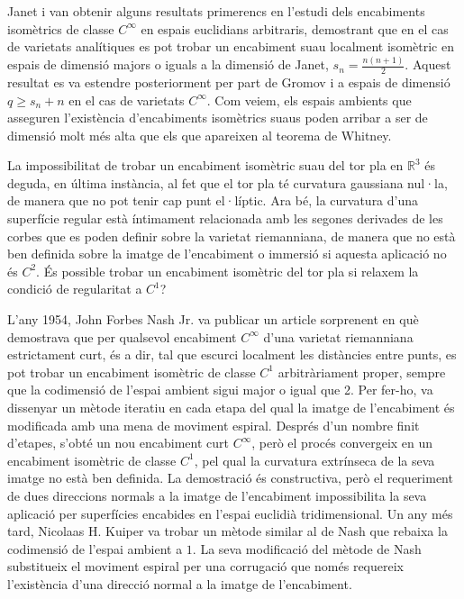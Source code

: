 Janet i \citet{cartan1927} van obtenir alguns resultats primerencs en l'estudi dels encabiments isomètrics de classe $C^\infty$ en espais euclidians arbitraris, demostrant que en el cas de varietats analítiques es pot trobar un encabiment suau localment isomètric en espais de dimensió majors o iguals a la dimensió de Janet, $s_n = \frac{n(n+1)}{2}$. Aquest resultat es va estendre posteriorment per part de Gromov i \citet{rokhlin1970} a espais de dimensió $q\ge s_n+n$ en el cas de varietats $C^\infty$. Com veiem, els espais ambients que asseguren l'existència d'encabiments isomètrics suaus poden arribar a ser de dimensió molt més alta que els que apareixen al teorema de Whitney.

La impossibilitat de trobar un encabiment isomètric suau del tor pla en $\mathbb R^3$ és deguda, en última instància, al fet que el tor pla té curvatura gaussiana nul·la, de manera que no pot tenir cap punt el·líptic. Ara bé, la curvatura d'una superfície regular està íntimament relacionada amb les segones derivades de les corbes que es poden definir sobre la varietat riemanniana, de manera que no està ben definida sobre la imatge de l'encabiment o immersió si aquesta aplicació no és $C^2$. És possible trobar un encabiment isomètric del tor pla si relaxem la condició de regularitat a $C^1$?

L'any 1954, John Forbes Nash Jr. va publicar un article sorprenent en què demostrava que per qualsevol encabiment $C^\infty$ d'una varietat riemanniana estrictament curt, és a dir, tal que escurci localment les distàncies entre punts, es pot trobar un encabiment isomètric de classe $C^1$ arbitràriament proper, sempre que la codimensió de l'espai ambient sigui major o igual que 2. Per fer-ho, va dissenyar un mètode iteratiu en cada etapa del qual la imatge de l'encabiment és modificada amb una mena de moviment espiral. Després d'un nombre finit d'etapes, s'obté un nou encabiment curt $C^\infty$, però el procés convergeix en un encabiment isomètric de classe $C^1$, pel qual la curvatura extrínseca de la seva imatge no està ben definida. La demostració és constructiva, però el requeriment de dues direccions normals a la imatge de l'encabiment impossibilita la seva aplicació per superfícies encabides en l'espai euclidià tridimensional. Un any més tard, Nicolaas H. Kuiper va trobar un mètode similar al de Nash que rebaixa la codimensió de l'espai ambient a $1$. La seva modificació del mètode de Nash substitueix el moviment espiral per una corrugació que només requereix l'existència d'una direcció normal a la imatge de l'encabiment.

